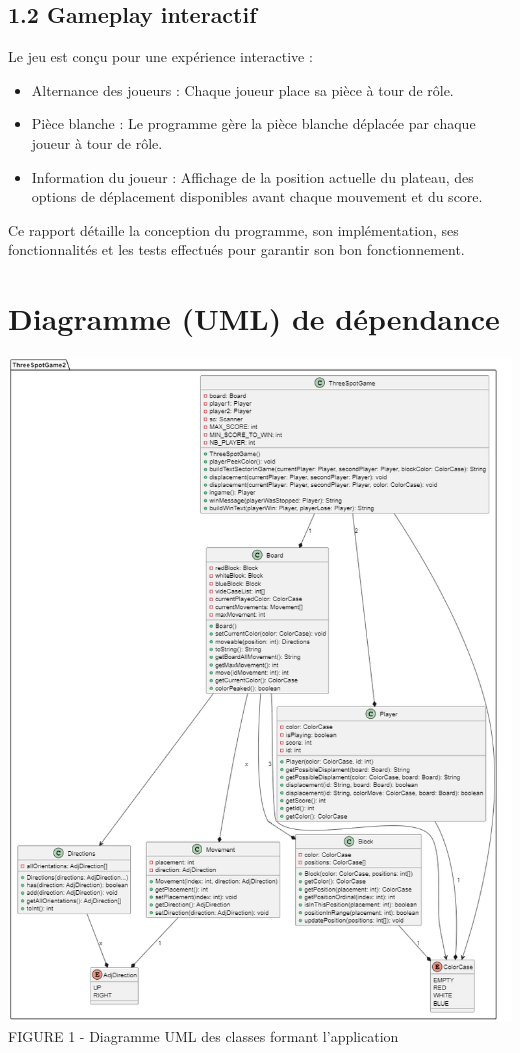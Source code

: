 \documentclass[a4paper,11pt]{article}
\begin{document}
\subsection{1.2 Gameplay interactif}

Le jeu est conçu pour une expérience interactive :
\begin{itemize}
    \item Alternance des joueurs : Chaque joueur place sa pièce à tour de rôle.
    \item Pièce blanche : Le programme gère la pièce blanche déplacée par chaque joueur à tour de rôle.
    \item Information du joueur : Affichage de la position actuelle du plateau, des options de déplacement disponibles avant chaque mouvement et du score.
\end{itemize}

Ce rapport détaille la conception du programme, son implémentation, ses fonctionnalités et les tests effectués pour garantir son bon fonctionnement.

\newpage
\section{Diagramme (UML) de dépendance}
\begin{center}
   
    \centering
    \includegraphics[scale=0.5]{diagrameUML.png}
    FIGURE 1 - Diagramme UML des classes formant l'application
\end{center}
\end{document}
